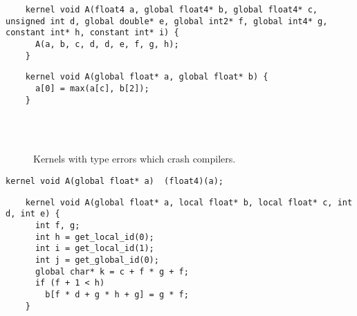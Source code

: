 \newsavebox{\NvidiaRecursionSegfault}
\begin{lrbox}{\NvidiaRecursionSegfault}
  \hspace{1.5em}
  \begin{lstlisting}
    kernel void A(float4 a, global float4* b, global float4* c, unsigned int d, global double* e, global int2* f, global int4* g, constant int* h, constant int* i) {
      A(a, b, c, d, d, e, f, g, h);
    }
  \end{lstlisting}
\end{lrbox}

\newsavebox{\OclgrindUncorrectedTypos}
\begin{lrbox}{\OclgrindUncorrectedTypos}
  \hspace{1.5em}
  \begin{lstlisting}
    kernel void A(global float* a, global float* b) {
      a[0] = max(a[c], b[2]);
    }
  \end{lstlisting}
\end{lrbox}

\begin{figure}
  \centering
  \\%
  \\%
  \caption{Kernels with type errors which crash compilers.}
  \label{}
\end{figure}

\texttt{kernel void A(global float* a) { (float4)(a); }}

\newsavebox{\NvidiaCompileSegfault}
\begin{lrbox}{\NvidiaCompileSegfault}
  \hspace{1.5em}
  \begin{lstlisting}
    kernel void A(global float* a, local float* b, local float* c, int d, int e) {
      int f, g;
      int h = get_local_id(0);
      int i = get_local_id(1);
      int j = get_global_id(0);
      global char* k = c + f * g + f;
      if (f + 1 < h)
        b[f * d + g * h + g] = g * f;
    }
  \end{lstlisting}
\end{lrbox}

